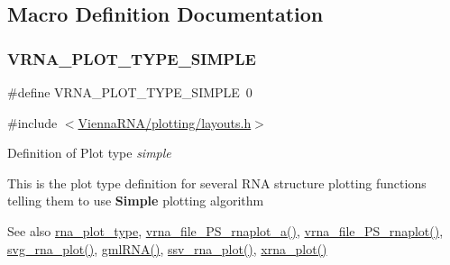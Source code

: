 \subsection{Macro Definition Documentation}
\mbox{\label{group__plot__layout__utils_gae6d17b9f0a53cf5205a9181e0f8422e9}} 
\subsubsection{\texorpdfstring{VRNA\_PLOT\_TYPE\_SIMPLE}{VRNA\_PLOT\_TYPE\_SIMPLE}}
{\footnotesize\ttfamily \#define V\+R\+N\+A\+\_\+\+P\+L\+O\+T\+\_\+\+T\+Y\+P\+E\+\_\+\+S\+I\+M\+P\+LE~0}



{\ttfamily \#include $<$\mbox{\hyperlink{layouts_8h}{Vienna\+R\+N\+A/plotting/layouts.\+h}}$>$}



Definition of Plot type {\itshape simple} 

This is the plot type definition for several R\+NA structure plotting functions telling them to use {\bfseries{Simple}} plotting algorithm

\begin{DoxySeeAlso}{See also}
\mbox{\hyperlink{group__plotting__utils__deprecated_ga5964c4581431b098b80027d6e14dcdd4}{rna\+\_\+plot\+\_\+type}}, \mbox{\hyperlink{group__plotting__utils_ga139a31dd0ba9fc6612431f67de901c31}{vrna\+\_\+file\+\_\+\+P\+S\+\_\+rnaplot\+\_\+a()}}, \mbox{\hyperlink{group__plotting__utils_gabdc8f6548ba4a3bc3cd868ccbcfdb86a}{vrna\+\_\+file\+\_\+\+P\+S\+\_\+rnaplot()}}, \mbox{\hyperlink{group__plotting__utils_gae7853539b5df98f294b4af434e979304}{svg\+\_\+rna\+\_\+plot()}}, \mbox{\hyperlink{group__plotting__utils_ga70834bc8c0aad4fe6824ff76ccb8f329}{gml\+R\+N\+A()}}, \mbox{\hyperlink{group__plotting__utils_gadd368528755f9a830727b680243541df}{ssv\+\_\+rna\+\_\+plot()}}, \mbox{\hyperlink{group__plotting__utils_ga2f6d5953e6a323df898896b8d6614483}{xrna\+\_\+plot()}} 
\end{DoxySeeAlso}
\mbox{\label{group__plot__layout__utils_ga94d4c863ecac2f220f76658afb92f964}} 

